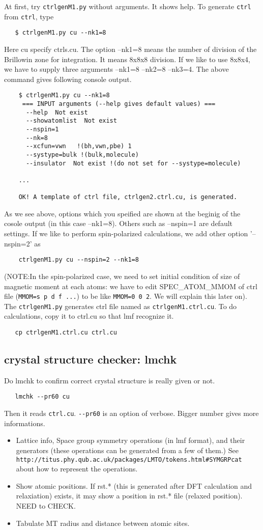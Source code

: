 \documentclass[a4paper,10pt,epsf,fleqn]{article}
\begin{document}
At first, try \verb+ctrlgenM1.py+ without arguments. It shows help. 
To generate \verb+ctrl+ from \verb+ctrl+, type
\begin{verbatim}
   $ ctrlgenM1.py cu --nk1=8
\end{verbatim}
Here cu specify ctrls.cu. The option --nk1=8 
means the number of division of the Brillowin zone for
integration. It means 8x8x8 division. If we like to use 8x8x4, 
we have to supply three arguments --nk1=8 --nk2=8 --nk3=4.
The above command gives following console output.
\begin{verbatim}
    $ ctrlgenM1.py cu --nk1=8
     === INPUT arguments (--help gives default values) === 
      --help  Not exist
      --showatomlist  Not exist
      --nspin=1
      --nk=8
      --xcfun=vwn   !(bh,vwn,pbe) 1
      --systype=bulk !(bulk,molecule)
      --insulator  Not exist !(do not set for --systype=molecule)

    ...

    OK! A template of ctrl file, ctrlgen2.ctrl.cu, is generated.
\end{verbatim}
As we see above, 
options which you speified are shown at the beginig of the cosole output
(in this case --nk1=8). Others such as --nspin=1 are default settings.
If we like to perform spin-polarized calculations, we add other option
'--nspin=2' as
\begin{verbatim}
    ctrlgenM1.py cu --nspin=2 --nk1=8
\end{verbatim}
(NOTE:In the spin-polarized case, we need to set initial condition of size of
magnetic moment at each atoms: we have to edit
SPEC\_ATOM\_MMOM of ctrl file (\verb+MMOM=s p d f ...+) to be like
\verb+MMOM=0 0 2+. We will explain this later on).
The \verb+ctrlgenM1.py+ generates ctrl file named as
\verb+ctrlgenM1.ctrl.cu+. To do calculations, copy it to ctrl.cu so 
that lmf recognize it.
\begin{verbatim}
   cp ctrlgenM1.ctrl.cu ctrl.cu
\end{verbatim}

\subsection{crystal structure checker: lmchk}
Do lmchk to confirm correct crystal structure is really given or not.
\begin{verbatim}
   lmchk --pr60 cu 
\end{verbatim}
Then it reads \verb+ctrl.cu+. \verb+--pr60+ is an option of verbose. Bigger number gives more informations.
\begin{itemize}
\item Lattice info, Space group symmetry operations (in lmf format), and
      their generators (these operations can be generated from a few of them.)
      See \verb+http://titus.phy.qub.ac.uk/packages/LMTO/tokens.html#SYMGRPcat+
      about how to represent the operations.
\item Show atomic positions. If rst.* (this is generated after DFT
      calculation and relaxiation) exists, it may show a position in
      rst.* file (relaxed position). NEED to CHECK.
\item Tabulate MT radius and distance between atomic sites.
\end{itemize}
\end{document}
